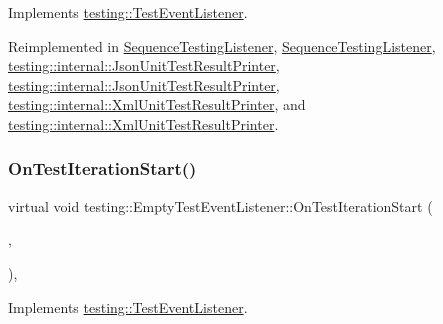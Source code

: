 Implements \mbox{\hyperlink{classtesting_1_1_test_event_listener_a550fdb3e55726e4cefa09f5697941425}{testing\+::\+Test\+Event\+Listener}}.



Reimplemented in \mbox{\hyperlink{class_sequence_testing_listener_a783bc01e2a95f5bf73bbde4d96832e0f}{Sequence\+Testing\+Listener}}, \mbox{\hyperlink{class_sequence_testing_listener_ae3a4e15e6c811a7b70992669d659e11e}{Sequence\+Testing\+Listener}}, \mbox{\hyperlink{classtesting_1_1internal_1_1_json_unit_test_result_printer_a9716a1dd5a3608181748c1b6f039c365}{testing\+::internal\+::\+Json\+Unit\+Test\+Result\+Printer}}, \mbox{\hyperlink{classtesting_1_1internal_1_1_json_unit_test_result_printer_a937dff300da12370b9dd0a0dd82a529a}{testing\+::internal\+::\+Json\+Unit\+Test\+Result\+Printer}}, \mbox{\hyperlink{classtesting_1_1internal_1_1_xml_unit_test_result_printer_abf972ca903d66d5ea52d9b1bc0a27f21}{testing\+::internal\+::\+Xml\+Unit\+Test\+Result\+Printer}}, and \mbox{\hyperlink{classtesting_1_1internal_1_1_xml_unit_test_result_printer_a37cf92d3953b2be56f9fcb049a68846c}{testing\+::internal\+::\+Xml\+Unit\+Test\+Result\+Printer}}.

\mbox{\label{classtesting_1_1_empty_test_event_listener_a836f05829855dc60d13ba99ad712c0dd}} 
\subsubsection{\texorpdfstring{OnTestIterationStart()}{OnTestIterationStart()}\hspace{0.1cm}{\footnotesize\ttfamily [1/3]}}
{\footnotesize\ttfamily virtual void testing\+::\+Empty\+Test\+Event\+Listener\+::\+On\+Test\+Iteration\+Start (\begin{DoxyParamCaption}\item[{const \mbox{\hyperlink{classtesting_1_1_unit_test}{Unit\+Test}} \&}]{,  }\item[{int}]{ }\end{DoxyParamCaption})\hspace{0.3cm}{\ttfamily [inline]}, {\ttfamily [virtual]}}



Implements \mbox{\hyperlink{classtesting_1_1_test_event_listener_a60cc09b7907cb329d152eb5e7133bdeb}{testing\+::\+Test\+Event\+Listener}}.




